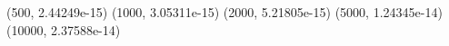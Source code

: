 (500, 2.44249e-15) (1000, 3.05311e-15) (2000, 5.21805e-15) (5000, 1.24345e-14) (10000, 2.37588e-14) 